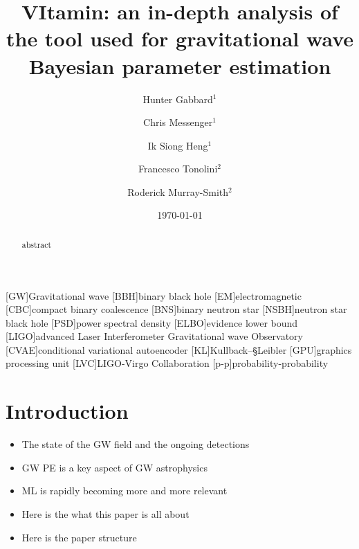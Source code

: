 \documentclass[%
showpacs,
 amsmath,amssymb,
 aps,
 twocolumn,
 prl,
 reprint,
floatfix,
]{revtex4-1}
\begin{document}

\title{VItamin: an in-depth analysis of the tool used for gravitational wave Bayesian parameter estimation}

\author{Hunter Gabbard$^1$}
\author{Chris Messenger$^1$}
\author{Ik Siong Heng$^1$}
\author{Francesco Tonolini$^2$}
\author{Roderick Murray-Smith$^2$}


\date{\today}

\begin{abstract}
abstract
\end{abstract}

\maketitle

%

[GW]{Gravitational wave}
[BBH]{binary black hole}
[EM]{electromagnetic}
[CBC]{compact binary coalescence}
[BNS]{binary neutron star}
[NSBH]{neutron star black hole}
[PSD]{power spectral density}
[ELBO]{evidence lower bound}
[LIGO]{advanced Laser Interferometer Gravitational wave Observatory}
[CVAE]{conditional variational autoencoder}
[KL]{Kullback--§Leibler}
[GPU]{graphics processing unit}
[LVC]{LIGO-Virgo Collaboration}
[p-p]{probability-probability}

\section{Introduction}

\begin{itemize}
\item The state of the GW field and the ongoing detections
\item GW PE is a key aspect of GW astrophysics
\item ML is rapidly becoming more and more relevant
\item Here is the what this paper is all about
\item Here is the paper structure
\end{itemize}
\end{document}
